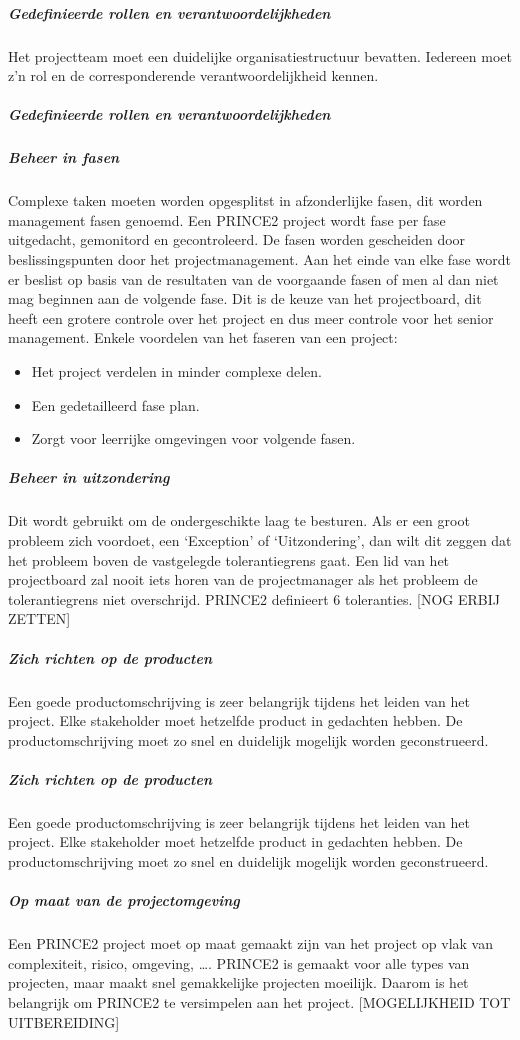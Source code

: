 \documentclass[]{article}
\begin{document}
\subparagraph{Gedefinieerde rollen en verantwoordelijkheden}
Het projectteam moet een duidelijke organisatiestructuur bevatten. Iedereen moet z’n rol en de corresponderende verantwoordelijkheid kennen.

\subparagraph{Gedefinieerde rollen en verantwoordelijkheden}

\subparagraph{Beheer in fasen}
Complexe taken moeten worden opgesplitst in afzonderlijke fasen, dit worden management fasen genoemd. Een PRINCE2 project wordt fase per fase uitgedacht, gemonitord en gecontroleerd. De fasen worden gescheiden door beslissingspunten door het projectmanagement. Aan het einde van elke fase wordt er beslist op basis van de resultaten van de voorgaande fasen of men al dan niet mag beginnen aan de volgende fase. Dit is de keuze van het projectboard, dit heeft een grotere controle over het project en dus meer controle voor het senior management. Enkele voordelen van het faseren van een project:
\begin{itemize}
\item Het project verdelen in minder complexe delen.
\item Een gedetailleerd fase plan.
\item Zorgt voor leerrijke omgevingen voor volgende fasen.
\end{itemize}

\subparagraph{Beheer in uitzondering}
Dit wordt gebruikt om de ondergeschikte laag te besturen. Als er een groot probleem zich voordoet, een ‘Exception’ of ‘Uitzondering’, dan wilt dit zeggen dat het probleem boven de vastgelegde tolerantiegrens gaat. Een lid van het projectboard zal nooit iets horen van de projectmanager als het probleem de tolerantiegrens niet overschrijd. PRINCE2 definieert 6 toleranties. [NOG ERBIJ ZETTEN]

\subparagraph{Zich richten op de producten}
Een goede productomschrijving is zeer belangrijk tijdens het leiden van het project. Elke stakeholder moet hetzelfde product in gedachten hebben. De productomschrijving moet zo snel en duidelijk mogelijk worden geconstrueerd.

\subparagraph{Zich richten op de producten}
Een goede productomschrijving is zeer belangrijk tijdens het leiden van het project. Elke stakeholder moet hetzelfde product in gedachten hebben. De productomschrijving moet zo snel en duidelijk mogelijk worden geconstrueerd.

\subparagraph{Op maat van de projectomgeving}
Een PRINCE2 project moet op maat gemaakt zijn van het project op vlak van complexiteit, risico, omgeving, …. PRINCE2 is gemaakt voor alle types van projecten, maar maakt snel gemakkelijke projecten moeilijk. Daarom is het belangrijk om PRINCE2 te versimpelen aan het project. [MOGELIJKHEID TOT UITBEREIDING]
\end{document}
